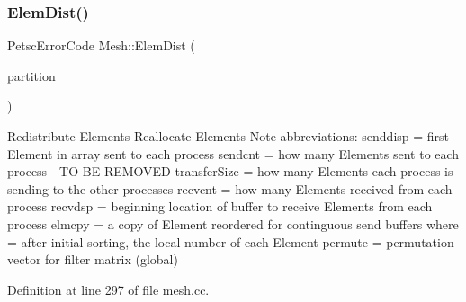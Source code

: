 \subsubsection{\texorpdfstring{Elem\+Dist()}{ElemDist()}}
{\footnotesize\ttfamily Petsc\+Error\+Code Mesh\+::\+Elem\+Dist (\begin{DoxyParamCaption}\item[{Eigen\+::\+Array$<$ Petsc\+Int, -\/1, 1 $>$ \&}]{partition }\end{DoxyParamCaption})\hspace{0.3cm}{\ttfamily [protected]}}

Redistribute Elements Reallocate Elements Note abbreviations\+: senddisp = first Element in array sent to each process sendcnt = how many Elements sent to each process -\/ TO BE R\+E\+M\+O\+V\+ED transfer\+Size = how many Elements each process is sending to the other processes recvcnt = how many Elements received from each process recvdsp = beginning location of buffer to receive Elements from each process elmcpy = a copy of Element reordered for continguous send buffers where = after initial sorting, the local number of each Element permute = permutation vector for filter matrix (global) 

Definition at line 297 of file mesh.\+cc.


